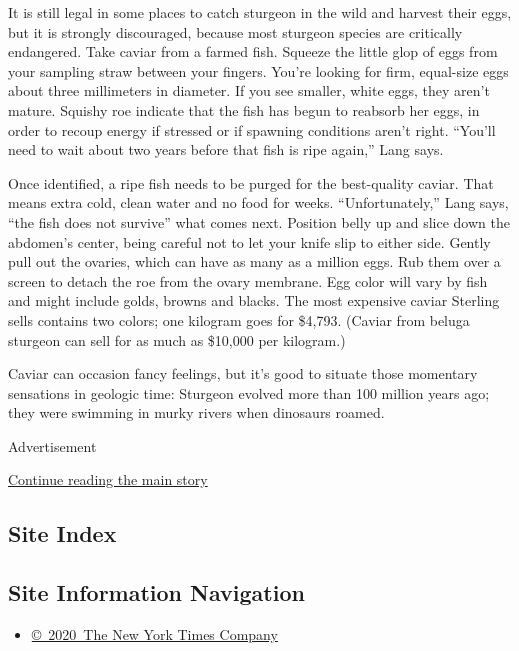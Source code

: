 It is still legal in some places to catch sturgeon in the wild and
harvest their eggs, but it is strongly discouraged, because most
sturgeon species are critically endangered. Take caviar from a farmed
fish. Squeeze the little glop of eggs from your sampling straw between
your fingers. You're looking for firm, equal-size eggs about three
millimeters in diameter. If you see smaller, white eggs, they aren't
mature. Squishy roe indicate that the fish has begun to reabsorb her
eggs, in order to recoup energy if stressed or if spawning conditions
aren't right. ``You'll need to wait about two years before that fish is
ripe again,'' Lang says.

Once identified, a ripe fish needs to be purged for the best-quality
caviar. That means extra cold, clean water and no food for weeks.
``Unfortunately,'' Lang says, ``the fish does not survive'' what comes
next. Position belly up and slice down the abdomen's center, being
careful not to let your knife slip to either side. Gently pull out the
ovaries, which can have as many as a million eggs. Rub them over a
screen to detach the roe from the ovary membrane. Egg color will vary by
fish and might include golds, browns and blacks. The most expensive
caviar Sterling sells contains two colors; one kilogram goes for
\$4,793. (Caviar from beluga sturgeon can sell for as much as \$10,000
per kilogram.)

Caviar can occasion fancy feelings, but it's good to situate those
momentary sensations in geologic time: Sturgeon evolved more than 100
million years ago; they were swimming in murky rivers when dinosaurs
roamed.

Advertisement

\protect\hyperlink{after-bottom}{Continue reading the main story}

\hypertarget{site-index}{%
\subsection{Site Index}\label{site-index}}

\hypertarget{site-information-navigation}{%
\subsection{Site Information
Navigation}\label{site-information-navigation}}

\begin{itemize}
\tightlist
\item
  \href{https://help.nytimes3xbfgragh.onion/hc/en-us/articles/115014792127-Copyright-notice}{©~2020~The
  New York Times Company}
\end{itemize}

